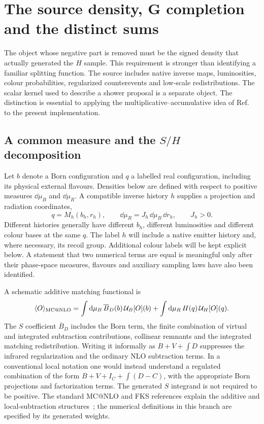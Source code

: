 \section{The source density, G completion and the distinct sums}
\label{sec:source-colour}

The object whose negative part is removed must be the signed density that
actually generated the $H$ sample. This requirement is stronger than
identifying a familiar splitting function. The source includes native
inverse maps, luminosities, colour probabilities, regularized counterevents
and low-scale redistributions. The scalar kernel used to describe a shower
proposal is a separate object. The distinction is essential to applying the
multiplicative--accumulative idea of Ref.~\cite{NasonSalam} to the present
implementation.

\subsection{A common measure and the \texorpdfstring{$S/H$}{S/H} decomposition}
\label{sec:source-measures}

Let $b$ denote a Born configuration and $q$ a labelled real configuration,
including its physical external flavours. Densities below are defined with
respect to positive measures $\dd\mu_B$ and $\dd\mu_R$. A compatible inverse
history $h$ supplies a projection and radiation coordinates,
\begin{equation}
 q=M_h(b_h,r_h),\qquad
 \dd\mu_R=J_h\,\dd\mu_B\,\dd r_h,\qquad J_h>0.
 \label{eq:source-measure}
\end{equation}
Different histories generally have different $b_h$, different luminosities
and different colour bases at the same $q$. The label $h$ will include a
native emitter history and, where necessary, its recoil group. Additional
colour labels will be kept explicit below. A statement that two numerical
terms are equal is meaningful only after their phase-space measures,
flavours and auxiliary sampling laws have also been identified.

A schematic additive matching functional is
\begin{equation}
 \langle O\rangle_{\text{MC@NLO}}
 =\int\mathrm d\mu_B\,\overline B_D(b)\,\mathcal U_B[O](b)
 +\int\mathrm d\mu_R\,H(q)\,\mathcal U_H[O](q).
 \label{eq:source-functional}
\end{equation}
The $S$ coefficient $\overline B_D$ includes the Born term, the finite
combination of virtual and integrated subtraction contributions, collinear
remnants and the integrated matching redistribution. Writing it informally
as $B+V+\int D$ suppresses the infrared regularization and the ordinary NLO
subtraction terms. In a conventional local notation one would instead
understand a regulated combination of the form
$B+V+I_C+\int(D-C)$, with the appropriate Born projections and factorization
terms. The generated $S$ integrand is not required to be positive. The
standard MC@NLO and FKS references explain the additive and local-subtraction
structures~\cite{FrixioneWebber,FKS,Alwall}; the numerical definitions in this
branch are specified by its generated weights.

